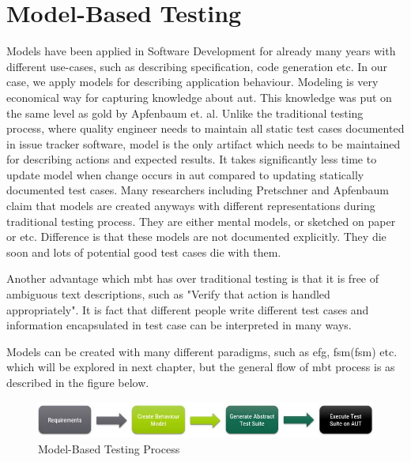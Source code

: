 \section{Model-Based Testing}

\par
Models have been applied in Software Development for already many years with different use-cases, such as describing specification, code generation etc. In our case, we apply models for describing application behaviour. Modeling is very economical way for capturing knowledge about \acrlong{aut}. This knowledge was put on the same level as gold by Apfenbaum et. al. \cite{Apfenbaum_MBT} Unlike the traditional testing process, where quality engineer needs to maintain all static test cases documented in issue tracker software, model is the only artifact which needs to be maintained for describing actions and expected results. It takes significantly less time to update model when change occurs in \acrlong{aut} compared to updating statically documented test cases. Many researchers including Pretschner \cite{Pretschner_MBTInPractice} and Apfenbaum \cite{Apfenbaum_MBT} claim that models are created anyways with different representations during traditional testing process. They are either mental models, or sketched on paper or etc. Difference is that these models are not documented explicitly. They die soon and lots of potential good test cases die with them.

\par
Another advantage which \acrshort{mbt} has over traditional testing is that it is free of ambiguous text descriptions, such as "Verify that action is handled appropriately". It is fact that different people write different test cases and information encapsulated in test case can be interpreted in many ways.

\par
Models can be created with many different paradigms, such as \acrlong{efg}, \acrlong{fsm}(\acrshort{fsm}) etc. which will be explored in next chapter, but the general flow of \acrshort{mbt} process is as described in the figure below. 


\begin{figure} [htbp!]
	\centering
					\includegraphics[width=1\textwidth]{figures/MBT_Flow.JPG}
					\caption{\label{Fig:MBT_Flow} Model-Based Testing Process}
\end{figure}

